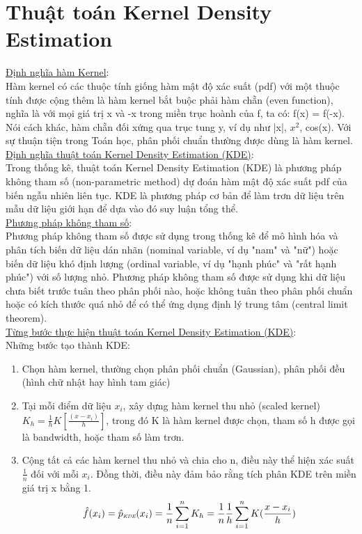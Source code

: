 \documentclass[a4paper, 13pt]{report}
\begin{document}
\section{Thuật toán Kernel Density Estimation}
\underline{Định nghĩa hàm Kernel}:\\
Hàm kernel có các thuộc tính giống hàm mật độ xác suất (pdf) với một thuộc tính được cộng thêm là hàm kernel bắt buộc phải hàm chẵn (even function), nghĩa là với mọi giá trị x và -x trong miền trục hoành của f, ta có: f(x) = f(-x). Nói cách khác, hàm chẵn đối xứng qua trục tung y, ví dụ như |x|, $x^2$, cos(x). Với sự thuận tiện trong Toán học, phân phối chuẩn thường được dùng là hàm kernel.\\
\underline{Định nghĩa thuật toán Kernel Density Estimation (KDE)}:\\
Trong thống kê, thuật toán Kernel Density Estimation (KDE) là phương pháp không tham số (non-parametric method) dự đoán hàm mật độ xác suất pdf của biến ngẫu nhiên liên tục. KDE là phương pháp cơ bản để làm trơn dữ liệu trên mẫu dữ liệu giới hạn để dựa vào đó suy luận tổng thể.\\
\underline{Phương pháp không tham số}:\\
Phương pháp không tham số được sử dụng trong thống kê để mô hình hóa và phân tích biến dữ liệu dán nhãn (nominal variable, ví dụ "nam" và "nữ") hoặc biến dữ liệu khó định lượng (ordinal variable, ví dụ "hạnh phúc" và "rất hạnh phúc") với số lượng nhỏ. Phương pháp không tham số được sử dụng khi dữ liệu chưa biết trước tuân theo phân phối nào, hoặc không tuân theo phân phối chuẩn hoặc có kích thước quá nhỏ để có thể ứng dụng định lý trung tâm (central limit theorem). \\
\underline{Từng bước thực hiện thuật toán Kernel Density Estimation (KDE)}:\\
Những bước tạo thành KDE:\\
\begin{enumerate}
\item Chọn hàm kernel, thường chọn phân phối chuẩn (Gaussian), phân phối đều (hình chữ nhật hay hình tam giác)
\item Tại mỗi điểm dữ liệu $x_i$, xây dựng hàm kernel thu nhỏ (scaled kernel) $K_h = \frac{1}{h}K[\frac{(x-x_i)}{h}]$, trong đó K là hàm kernel được chọn, tham số h được gọi là bandwidth, hoặc tham số làm trơn. 
\item Cộng tất cả các hàm kernel thu nhỏ và chia cho n, điều này thể hiện xác suất $\frac{1}{n}$ đối với mỗi $x_i$. Đồng thời, điều này đảm bảo rằng tích phân KDE trên miền giá trị x bằng 1.\\  
\[
\hat{f}(x_i) = \hat{p}_\textit{\tiny\tiny KDE}(x_i) = \frac{1}{n}\sum_{i=1}^{n} K_h = \frac{1}{n}\frac{1}{h}\sum_{i=1}^{n} K(\frac{x-x_i}{h})
\]
\end{enumerate}
\end{document}
